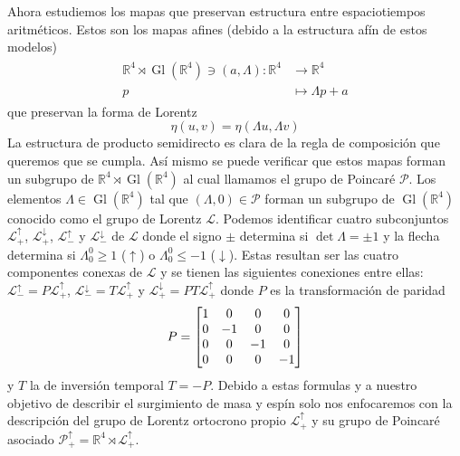 \documentclass[11pt]{article}
\DeclareMathOperator{\Gl}{Gl}
\begin{document}
Ahora estudiemos los mapas que preservan estructura entre espaciotiempos aritméticos. Estos son los mapas afines (debido a la estructura afín de estos modelos)
\begin{align}
\begin{split}
\mathbb{R}^4\rtimes \Gl(\mathbb{R}^4)\ni(a,\Lambda):\mathbb{R}^4&\rightarrow\mathbb{R}^4 \\
p&\mapsto\Lambda p + a
\end{split}
\end{align}
que preservan la forma de Lorentz
\begin{equation}
\eta(u,v)=\eta(\Lambda u,\Lambda v)
\end{equation}
La estructura de producto semidirecto es clara de la regla de composición que queremos que se cumpla. Así mismo se puede verificar que estos mapas forman un subgrupo de $\mathbb{R}^4\rtimes\Gl(\mathbb{R}^4)$ al cual llamamos el grupo de Poincaré $\mathcal{P}$. Los elementos $\Lambda\in\Gl(\mathbb{R}^4)$ tal que $(\Lambda,0)\in\mathcal{P}$ forman un subgrupo de $\Gl(\mathbb{R}^4)$ conocido como el grupo de Lorentz $\mathcal{L}$. Podemos identificar cuatro subconjuntos $\mathcal{L}_+^\uparrow$, $\mathcal{L}_+^\downarrow$, $\mathcal{L}_-^\uparrow$ y $\mathcal{L}_-^\downarrow$ de $\mathcal{L}$ donde el signo $\pm$ determina si $\det\Lambda=\pm 1$ y la flecha determina si $\Lambda^0_0\geq 1$ ($\uparrow$) o $\Lambda^0_0\leq -1$ ($\downarrow$). Estas resultan ser las cuatro componentes conexas de $\mathcal{L}$ y se tienen las siguientes conexiones entre ellas: $\mathcal{L}_-^\uparrow=P\mathcal{L}_+^\uparrow$, $\mathcal{L}_-^\downarrow=T\mathcal{L}_+^\uparrow$ y $\mathcal{L}_+^\downarrow=PT\mathcal{L}_+^\uparrow$ donde $P$ es la transformación de paridad
\begin{equation}
P=\mqty[1 & 0 & 0 & 0 \\ 0 & -1 & 0 & 0 \\ 0 & 0 & -1 & 0 \\ 0 & 0 & 0 & -1]
\end{equation} 
y $T$ la de inversión temporal $T=-P$. Debido a estas formulas y a nuestro objetivo de describir el surgimiento de masa y espín solo nos enfocaremos con la descripción del grupo de Lorentz ortocrono propio $\mathcal{L}_+^\uparrow$ y su grupo de Poincaré asociado $\mathcal{P}_+^\uparrow=\mathbb{R}^4\rtimes\mathcal{L}_+^\uparrow$.
\end{document}
